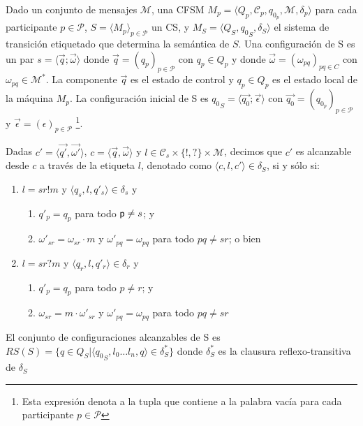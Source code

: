 \begin{definition}
\label{def:estadosyconf} Dado un conjunto de mensajes $\mathcal{M}$, una CFSM $\textit{M}_p = \langle Q_p, \mathcal{C}_p, q_{0_p}, \mathcal{M}, \delta_p \rangle$ para cada participante $p \in \mathcal{P}$, $S=\langle M_p \rangle_{p \in \mathcal{P}}$ un CS, y $M_S = \langle Q_S, 
{q_0}_S, \delta_S \rangle$ el sistema de transición etiquetado que determina la semántica de $S$. Una configuración de S es un par $s = \langle \overrightarrow{q} ; \overrightarrow{\omega} \rangle$ donde $\overrightarrow{q} = (q_p)_{p \in \mathcal{P}}$ con $q_p \in Q_p$ y donde $\overrightarrow{\omega} = (\omega_{pq})_{pq \in C}$ con $\omega_{pq} \in \mathcal{M}^*$. La componente $\overrightarrow{q}$ es el estado de control y $q_p \in Q_p$ es el estado local de la máquina $ M_p$. La configuración inicial de S es ${q_0}_S = \langle \overrightarrow{q_0} ; \overrightarrow{\epsilon} \rangle$ con $\overrightarrow{q_0} = (q_{0_p})_{p \in \mathcal{P}}$ y $\overrightarrow{\epsilon} = (\epsilon)_{p \in \mathcal{P}}$ \footnote{Esta expresión denota a la tupla que contiene a la palabra vacía para cada participante $p \in \mathcal{P}$}.

Dadas $c' = \langle \overrightarrow{q'},\overrightarrow{\omega'} \rangle$, $c = \langle \overrightarrow{q},\overrightarrow{\omega} \rangle$ y $l \in \mathcal{C}_s \times \{!,?\} \times \mathcal{M}$, decimos que $c'$ es alcanzable desde $c$ a través de la etiqueta $l$, denotado como $\langle c, l, c' \rangle \in \delta_S$, si y sólo si:
    \begin{enumerate}
		\item $l=sr!m$ y $\langle q_s,l,q'_s\rangle \in \delta_s$ y 
			\begin{enumerate}
				\item $q'_p = q_p$ para todo $\mathsf{p} \neq s$; y
				\item $\omega'_{sr} = \omega_{sr} \cdot m$ y  $\omega'_{pq} = \omega_{pq}$ para todo $pq \neq sr$; o bien
			\end{enumerate}
		\item $l=sr?m$ y $\langle q_r,l,q'_r\rangle \in \delta_r$ y 
			\begin{enumerate}
			\item $q'_{p} = q_{p}$ para todo $p \neq r$; y
				\item $\omega_{sr} = m \cdot \omega'_{sr}$ y $\omega'_{pq} = \omega_{pq}$ para todo $pq \neq sr$
			\end{enumerate}
	\end{enumerate}
El conjunto de configuraciones alcanzables de S es $RS(S) = \{q \in Q_S | \langle {q_0}_S,l_0 \ldots l_n,q \rangle \in \delta_S^* \}$ donde $\delta_S^*$ es la clausura reflexo-transitiva de $\delta_S$
\end{definition}

